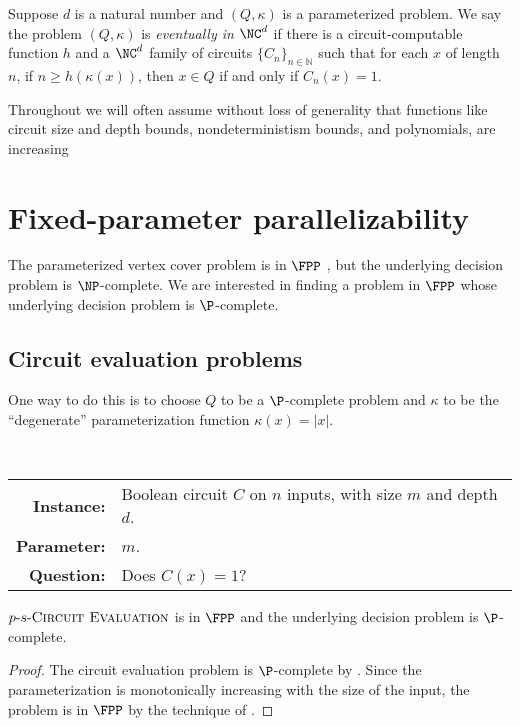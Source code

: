\documentclass{article}
\newcommand{\dash}{\textnormal{-}}
\begin{document}
\begin{definition}
  Suppose $d$ is a natural number and $(Q, \kappa)$ is a parameterized problem.
  We say the problem $(Q, \kappa)$ is \emph{eventually in $\NC^d$} if there is a circuit-computable function $h$ and a $\NC^d$ family of circuits $\{C_n\}_{n \in \mathbb{N}}$ such that for each $x$ of length $n$, if $n \geq h(\kappa(x))$, then $x \in Q$ if and only if $C_n(x) = 1$.
\end{definition}

Throughout we will often assume without loss of generality that functions like circuit size and depth bounds, nondeterministism bounds, and polynomials, are increasing

\section{Fixed-parameter parallelizability}

The parameterized vertex cover problem is in $\FPP$ \autocite{bst15}, but the underlying decision problem is $\NP$-complete.
We are interested in finding a problem in $\FPP$ whose underlying decision problem is $\P$-complete.

\subsection{Circuit evaluation problems}

One way to do this is to choose $Q$ to be a $\P$-complete problem and $\kappa$ to be the ``degenerate'' parameterization function $\kappa(x) = |x|$.

\begin{definition}[$p \dash s \dash \textsc{Circuit Evaluation}$]
  \mbox{} \\
  \begin{tabular}{r p{9.2cm}}
    \textbf{Instance:} & Boolean circuit $C$ on $n$ inputs, with size $m$ and depth $d$. \\
    \textbf{Parameter:} & $m$. \\
    \textbf{Question:} & Does $C(x) = 1$?
  \end{tabular}
\end{definition}

\begin{theorem}
  $p \dash s \dash \textsc{Circuit Evaluation}$ is in $\FPP$ and the underlying decision problem is $\P$-complete.
\end{theorem}
\begin{proof}
  The circuit evaluation problem is $\P$-complete by \autocite{ladner75}.
  Since the parameterization is monotonically increasing with the size of the input, the problem is in $\FPP$ by the technique of \autocite[Proposition~1.7]{fg06}.
\end{proof}
\end{document}
